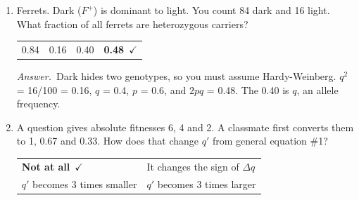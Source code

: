 \documentclass[11pt]{article}
\newcommand{\keyans}[1]{\par\medskip\noindent\textit{Answer.}\ #1\par\medskip}
\begin{document}
\begin{enumerate}[label=\textbf{\arabic*.}, leftmargin=2em, itemsep=1.4em]
\begin{enumerate}[label={}, leftmargin=2.4em, labelwidth=0pt, itemsep=2pt, topsep=0pt]
\item \hspace*{-2.4em}Organisms differ in survival and reproduction
\item \hspace*{-2.4em}\textbf{Types that survive and reproduce better become more frequent in the next generation}\ \(\checkmark\)
\item \hspace*{-2.4em}Some differences are heritable
\item \hspace*{-2.4em}More offspring are produced than survive
\end{enumerate}
\keyans{The three premises are things you observe. The inference follows from them by logic alone.}
\item Ferrets. Dark (\(F^{+}\)) is dominant to light. You count 84 dark and 16 light. What fraction of all ferrets are heterozygous carriers?
\nopagebreak\par{}
\par\smallskip\noindent\begin{tabularx}{\linewidth}{@{}YYYY@{}}
0.84 & 0.16 & 0.40 & \textbf{0.48}\ \(\checkmark\) \\
\end{tabularx}
\keyans{Dark hides two genotypes, so you must assume Hardy-Weinberg. \(q^2\) = 16/100 = 0.16, \(q\) = 0.4, \(p\) = 0.6, and \(2pq\) = 0.48. The 0.40 is \(q\), an allele frequency.}
\item A question gives absolute fitnesses 6, 4 and 2. A classmate first converts them to 1, 0.67 and 0.33. How does that change \(q'\) from general equation \#1?
\nopagebreak\par{}
\par\smallskip\noindent\begin{tabularx}{\linewidth}{@{}YY@{}}
\textbf{Not at all}\ \(\checkmark\) & It changes the sign of \(\Delta q\) \\[3pt]
\(q'\) becomes 3 times smaller & \(q'\) becomes 3 times larger \\

\end{tabularx}
\end{enumerate}
\end{document}
